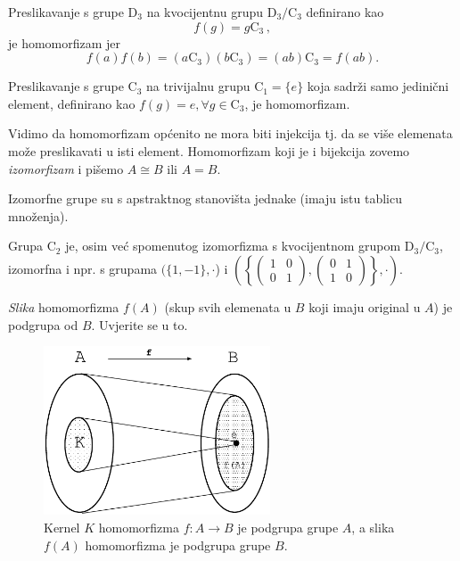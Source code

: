\begin{primjer}
    Preslikavanje s grupe $\mathrm{D}_3$ na kvocijentnu grupu
    $\mathrm{D}_3/\mathrm{C}_3$ definirano kao 
    \[
        f(g) = g\mathrm{C}_3 \,,
    \] je homomorfizam jer
    \[
        f(a) f(b) = (a \mathrm{C}_3) (b \mathrm{C}_3 ) =
        (a b) \mathrm{C}_3 = f(a b)
    .\] 
\end{primjer}
\begin{primjer}
    Preslikavanje s grupe $\mathrm{C}_3$ na trivijalnu grupu $\mathrm{C}_1 = \{e\}$
    koja sadrži samo jedinični element, definirano kao $f(g) = e,
    \forall g\in\mathrm{C}_3$, je homomorfizam.
    \label{pr:C3toC1}
\end{primjer}

Vidimo da homomorfizam općenito ne mora biti injekcija tj. da se više
elemenata može preslikavati u isti element.
Homomorfizam koji je i bijekcija zovemo \emph{izomorfizam} i
pišemo $A\cong B$ ili $A=B$.

Izomorfne grupe su s apstraktnog stanovišta jednake (imaju
istu tablicu množenja).

\begin{primjer}
Grupa C$_2$ je, osim već spomenutog izomorfizma s
kvocijentnom grupom $\mathrm{D}_3/\mathrm{C}_3$, izomorfna i
npr. s grupama $(\{1, -1\},\cdot$) i
$\left(\left\{
\begin{pmatrix}
1 & 0 \\ 0 & 1
\end{pmatrix},
\begin{pmatrix}
0 & 1 \\ 1 & 0
\end{pmatrix}
\right\},\cdot\right)$.
\end{primjer}

\emph{Slika} homomorfizma $f(A)$ (skup svih elemenata u $B$ koji imaju original u $A$) 
je podgrupa od $B$. Uvjerite se u to.


\begin{figure}[htpb]
    \centering
    \includegraphics[width=0.6\textwidth]{pics/homomorfizam}
    \caption{Kernel $K$ homomorfizma $f:A\to B$ je podgrupa grupe $A$,
    a slika $f(A)$ homomorfizma je podgrupa grupe $B$.}
    \label{fig:kernelslika}
\end{figure}


